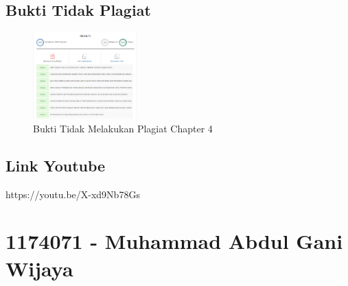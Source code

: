 \subsection{Bukti Tidak Plagiat}
\begin{figure}[H]
\centering
	\includegraphics[width=4cm]{figures/1174071/4/buktiplagiat/1.PNG}
	\caption{Bukti Tidak Melakukan Plagiat Chapter 4}
\end{figure}

\subsection{Link Youtube}
https://youtu.be/X-xd9Nb78Gs

\section{1174071 - Muhammad Abdul Gani Wijaya}
